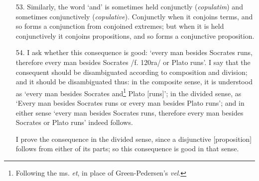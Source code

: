 \documentclass[]{article}
\begin{document}
\begin{enumerate}
\item[53.] Similarly, the word `and' is sometimes held conjunctly (\textit{copulatim}) and sometimes conjunctively (\textit{copulative}). Conjunctly when it conjoins terms, and so forms a conjunction from conjoined extremes; but when it is held conjunctively it conjoins propositions, and so forms a conjunctive proposition.
\item[54.] I ask whether this consequence is good: `every man besides Socrates runs, therefore every man besides Socrates /f. 120ra/ or Plato runs'. I say that the consequent should be disambiguated according to composition and division; and it should be disambiguated thus: in the composite sense, it is understood as `every man besides Socrates and\footnote{Following the ms. \textit{et}, in place of Green-Pedersen's \textit{vel}.} Plato [runs]'; in the divided sense, as `Every man besides Socrates runs or every man besides Plato runs'; and in either sense `every man besides Socrates runs, therefore every man besides Socrates or Plato runs' indeed follows.

I prove the consequence in the divided sense, since a disjunctive [proposition] follows from either of its parts; so this consequence is good in that sense.


\end{enumerate}
\end{document}
